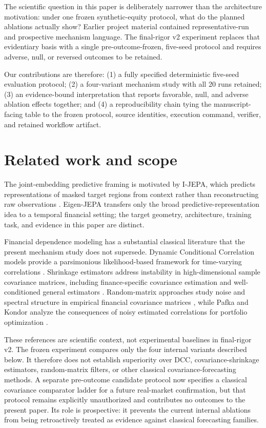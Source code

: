 \documentclass[11pt]{article}
\begin{document}
The scientific question in this paper is deliberately narrower than the architecture motivation: under one frozen synthetic-equity protocol, what do the planned ablations actually show? Earlier project material contained representative-run and prospective mechanism language. The final-rigor v2 experiment replaces that evidentiary basis with a single pre-outcome-frozen, five-seed protocol and requires adverse, null, or reversed outcomes to be retained.

Our contributions are therefore: (1) a fully specified deterministic five-seed evaluation protocol; (2) a four-variant mechanism study with all 20 runs retained; (3) an evidence-bound interpretation that reports favorable, null, and adverse ablation effects together; and (4) a reproducibility chain tying the manuscript-facing table to the frozen protocol, source identities, execution command, verifier, and retained workflow artifact.

\section{Related work and scope}
The joint-embedding predictive framing is motivated by I-JEPA, which predicts representations of masked target regions from context rather than reconstructing raw observations \cite{assran2023ijepa}. Eigen-JEPA transfers only the broad predictive-representation idea to a temporal financial setting; the target geometry, architecture, training task, and evidence in this paper are distinct.

Financial dependence modeling has a substantial classical literature that the present mechanism study does not supersede. Dynamic Conditional Correlation models provide a parsimonious likelihood-based framework for time-varying correlations \cite{engle2002dcc}. Shrinkage estimators address instability in high-dimensional sample covariance matrices, including finance-specific covariance estimation and well-conditioned general estimators \cite{ledoitwolf2003,ledoitwolf2004}. Random-matrix approaches study noise and spectral structure in empirical financial covariance matrices \cite{bouchaud2009rmt}, while Pafka and Kondor analyze the consequences of noisy estimated correlations for portfolio optimization \cite{pafka2004}.

These references are scientific context, not experimental baselines in final-rigor v2. The frozen experiment compares only the four internal variants described below. It therefore does not establish superiority over DCC, covariance-shrinkage estimators, random-matrix filters, or other classical covariance-forecasting methods. A separate pre-outcome candidate protocol now specifies a classical covariance comparator ladder for a future real-market confirmation, but that protocol remains explicitly unauthorized and contributes no outcomes to the present paper. Its role is prospective: it prevents the current internal ablations from being retroactively treated as evidence against classical forecasting families.
\end{document}
